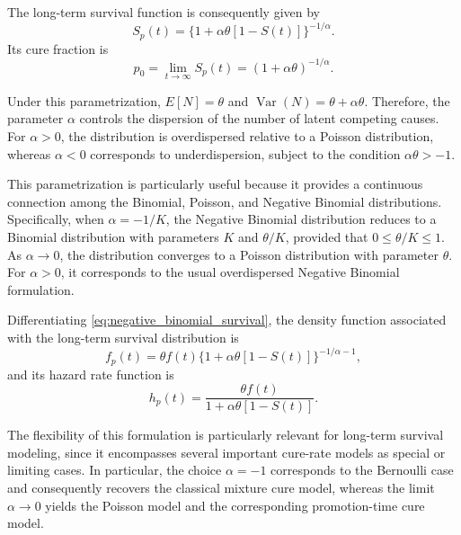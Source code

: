 The long-term survival function is consequently given by
\begin{equation}
\label{eq:negative_binomial_survival}
S_p\left(t\right)
=
\{1+\alpha\theta\left[1-S\left(t\right)\right]\}^{-1/\alpha}.
\end{equation}
Its cure fraction is
\begin{equation}
\label{eq:negative_binomial_cure_fraction}
p_0
=
\lim_{t\rightarrow\infty}S_p\left(t\right)
=
\left(1+\alpha\theta\right)^{-1/\alpha}.
\end{equation}

Under this parametrization, $E\left[N\right]=\theta$ and $\operatorname{Var}\left(N\right)=\theta+\alpha\theta$.
Therefore, the parameter $\alpha$ controls the dispersion of the number of latent
competing causes. For $\alpha>0$, the distribution is overdispersed relative to a
Poisson distribution, whereas $\alpha<0$ corresponds to underdispersion, subject to the
condition $\alpha\theta>-1$.

This parametrization is particularly useful because it provides a continuous connection
among the Binomial, Poisson, and Negative Binomial distributions. Specifically, when $\alpha=-1/K$,
the Negative Binomial distribution reduces to a Binomial distribution with parameters
$K$ and $\theta/K$, provided that $0\leq\theta/K\leq1$. As $\alpha\rightarrow0$, the
distribution converges to a Poisson distribution with parameter $\theta$. For
$\alpha>0$, it corresponds to the usual overdispersed Negative Binomial formulation.

Differentiating \eqref{eq:negative_binomial_survival}, the density function associated
with the long-term survival distribution is
\begin{equation}
\label{eq:negative_binomial_density}
f_p(t)
=
\theta f(t)
\{1+\alpha\theta\left[1-S(t)\right]\}^{-1/\alpha-1},
\end{equation}
and its hazard rate function is
\begin{equation}
\label{eq:negative_binomial_hazard}
h_p(t)
=
\frac{\theta f(t)}
{1+\alpha\theta\left[1-S(t)\right]}.
\end{equation}

The flexibility of this formulation is particularly relevant for long-term survival
modeling, since it encompasses several important cure-rate models as special or limiting
cases. In particular, the choice $\alpha=-1$ corresponds to the Bernoulli case and
consequently recovers the classical mixture cure model, whereas the limit
$\alpha\rightarrow0$ yields the Poisson model and the corresponding promotion-time cure
model.

